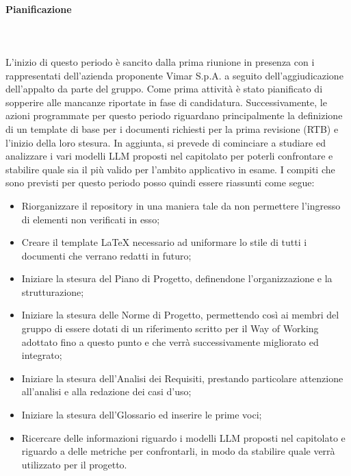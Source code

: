 \paragraph{Pianificazione} \hspace{1cm}
\\ \hspace{1cm} \\
L'inizio di questo periodo è sancito dalla prima riunione in presenza con i rappresentati dell'azienda proponente Vimar S.p.A. a seguito dell'aggiudicazione dell'appalto da parte del gruppo. Come prima attività è stato pianificato di sopperire alle mancanze riportate in fase di candidatura. Successivamente, le azioni programmate per questo periodo riguardano principalmente la definizione di un template di base per i documenti richiesti per la prima revisione (RTB) e l'inizio della loro stesura. In aggiunta, si prevede di cominciare a studiare ed analizzare i vari modelli LLM proposti nel capitolato per poterli confrontare e stabilire quale sia il più valido per l'ambito applicativo in esame.
I compiti che sono previsti per questo periodo posso quindi essere riassunti come segue:
\begin{itemize}
    \item Riorganizzare il repository in una maniera tale da non permettere l'ingresso di elementi non verificati in esso;
    \item Creare il template LaTeX necessario ad uniformare lo stile di tutti i documenti che verrano redatti in futuro;
    \item Iniziare la stesura del Piano di Progetto, definendone l'organizzazione e la strutturazione;
    \item Iniziare la stesura delle Norme di Progetto, permettendo così ai membri del gruppo di essere dotati di un riferimento scritto per il Way of Working adottato fino a questo punto e che verrà successivamente migliorato ed integrato;
    \item Iniziare la stesura dell'Analisi dei Requisiti, prestando particolare attenzione all'analisi e alla redazione dei casi d'uso;
    \item Iniziare la stesura dell'Glossario ed inserire le prime voci;
    \item Ricercare delle informazioni riguardo i modelli LLM proposti nel capitolato e riguardo a delle metriche per confrontarli, in modo da stabilire quale verrà utilizzato per il progetto.
\end{itemize}
